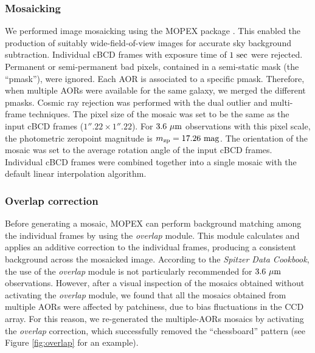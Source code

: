 \documentclass[preprint2]{emulateapj}
\begin{document}
\subsubsection{Mosaicking}
We performed image mosaicking using the MOPEX package \citep{makovozmarleau2005mopex}.
This enabled the production of suitably wide-field-of-view images for accurate sky background subtraction.
Individual cBCD frames with exposure time of $1~\rm sec$ were rejected.
Permanent or semi-permanent bad pixels, contained in a semi-static mask (the ``pmask''), were ignored.
Each AOR is associated to a specific pmask. 
Therefore, when multiple AORs were available for the same galaxy, 
we merged the different pmasks. 
Cosmic ray rejection was performed with the dual outlier and multi-frame techniques.
The pixel size of the mosaic was set to be the same as the input cBCD frames ($1''.22 \times 1''.22$).
For $3.6~\rm \mu m$ observations with this pixel scale, 
the photometric zeropoint magnitude is $m_{\rm zp} = 17.26 \rm~mag$.
The orientation of the mosaic was set to the average rotation angle of the input cBCD frames. 
Individual cBCD frames were combined together into a single mosaic with the default linear interpolation algorithm.

\subsubsection{Overlap correction}
Before generating a mosaic, MOPEX can perform background matching among the individual frames
by using the \emph{overlap} module. 
This module calculates and applies an additive correction to the individual frames,
producing a consistent background across the mosaicked image.
According to the \emph{Spitzer Data Cookbook}, the use of the \emph{overlap} module is not particularly recommended for 
$3.6~\rm \mu m$ observations. 
However, after a visual inspection of the mosaics obtained without activating the \emph{overlap} module,
we found that all the mosaics obtained from multiple AORs were affected by patchiness, 
due to bias fluctuations in the CCD array.
For this reason, we re-generated the multiple-AORs mosaics by activating the \emph{overlap} correction,
which successfully removed the ``chessboard'' pattern (see Figure \ref{fig:overlap} for an example).
\end{document}

